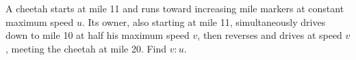 A cheetah starts at mile 11 and runs toward increasing mile markers at constant maximum speed $u$. Its owner, also starting at mile 11, simultaneously drives down to mile 10 at half his maximum speed $v$, then reverses and drives at speed $v$, meeting the cheetah at mile 20. Find $v:u$.
